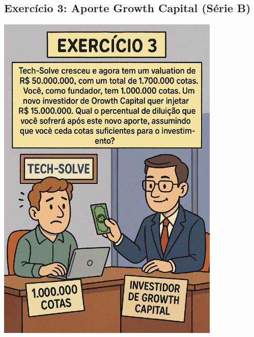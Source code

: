 \documentclass[
]{book}
\begin{document}
\subsection{\texorpdfstring{\textbf{Exercício 3:} Aporte Growth Capital (Série B)}{Exercício 3: Aporte Growth Capital (Série B)}}\label{exercuxedcio-3-aporte-growth-capital-suxe9rie-b}

\includegraphics[width=4.20833in,height=\textheight]{images/03-2025-08-19_20/exercicio-03.jpg}
\end{document}
